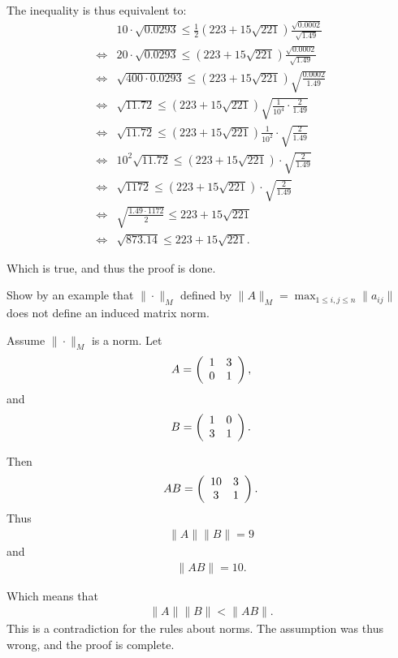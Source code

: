 \documentclass[10pt]{article}
\begin{document}
\begin{solution}[4]
The inequality is thus equivalent to:
\begin{align*}
 &  10 \cdot \sqrt{0.0293} \leq \frac{1}{2} (223 + 15 \sqrt{221})\frac{\sqrt{0.0002}}{\sqrt{1.49}} \\
\iff &  20 \cdot \sqrt{0.0293} \leq (223 + 15 \sqrt{221})\frac{\sqrt{0.0002}}{\sqrt{1.49}} \\
\iff & \sqrt{400 \cdot 0.0293} \leq (223 + 15 \sqrt{221}) \sqrt{\frac{0.0002}{1.49} } \\
\iff & \sqrt{11.72} \leq (223 + 15 \sqrt{221}) \sqrt{\frac{1}{10^{4}} \cdot \frac{2}{1.49}} \\
\iff & \sqrt{11.72} \leq (223 + 15 \sqrt{221}) \frac{1}{10 ^2} \cdot \sqrt{\frac{2}{1.49}} \\
\iff & 10 ^2 \sqrt{11.72} \leq (223 + 15 \sqrt{221}) \cdot \sqrt{\frac{2}{1.49}} \\
\iff &  \sqrt{1172} \leq (223 + 15 \sqrt{221}) \cdot \sqrt{\frac{2}{1.49}} \\
\iff &  \sqrt{\frac{1.49 \cdot1172}{2}} \leq 223 + 15 \sqrt{221} \\
\iff &  \sqrt{873.14} \leq 223 + 15 \sqrt{221}
.
\end{align*}

Which is true, and thus the proof is done.
\end{solution}
\begin{exercise}[5]  \label{exe:5}
Show by an example that \(\| \cdot \| _{M}\) defined by
\(\| A \| _{M} = \max_{1\leq i,j \leq n} \| a _{ij} \|\) does not define an induced
matrix norm.
\end{exercise}
\begin{solution}[5]  \label{sol:5}
Assume \(\| \cdot \| _{M}\) is a norm.
Let
\begin{align*}
A =
\left( \begin{array}{c c}
1  &  3 \\
0  &  1 
\end{array} \right)
,
\end{align*}
and
\begin{align*}
B =
\left( \begin{array}{c c}
1  &  0 \\
3  &  1
\end{array} \right)
.
\end{align*}

Then
\begin{align*}
AB =
\left( \begin{array}{c c}
10  &  3 \\
3  &  1
\end{array} \right)
.
\end{align*}
Thus
\begin{align*}
\| A \| \| B \| = 9
\end{align*}
and
\begin{align*}
\| AB \| = 10
.
\end{align*}

Which means that
\begin{align*}
\| A \| \| B \| < \| AB \| 
.
\end{align*}
This is a contradiction for the rules about norms. The assumption
was thus wrong, and the proof is complete.
\end{solution}
\end{document}
